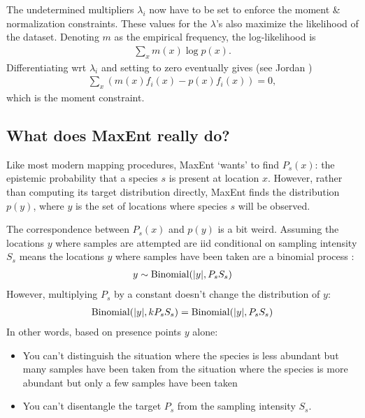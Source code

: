 \smallskip
The undetermined multipliers $\lambda_i$ now have to be set to enforce the moment \& normalization constraints. These values for the $\lambda$'s also maximize the likelihood of the dataset. Denoting $m$ as the empirical frequency, the log-likelihood is
\begin{eqnarray*}
    \sum_x m(x) \log p(x).
\end{eqnarray*}
Differentiating wrt $\lambda_i$ and setting to zero eventually gives (see Jordan \cite{Jordan:ch8}) 
\begin{eqnarray*}
    \sum_x \left(m(x) f_i(x) - p(x)f_i(x)\right) = 0,
\end{eqnarray*}
which is the moment constraint.

\subsection{What does MaxEnt really do?} 

Like most modern mapping procedures, MaxEnt `wants' to find $P_s(x)$: the epistemic probability that a species $s$ is present at location $x$. However, rather than computing its target distribution directly, MaxEnt finds the distribution $p(y)$, where $y$ is the set of locations where species $s$ will be observed. 

The correspondence between $P_s(x)$ and $p(y)$ is a bit weird. Assuming the locations $y$ where samples are attempted are iid conditional on sampling intensity $S_s$ means the locations $y$ where samples have been taken are a binomial process \cite{Moller:ch3}:
\begin{eqnarray*}
    y\sim \textup{Binomial}(|y|, P_s S_s) 
\end{eqnarray*}
However, multiplying $P_s$ by a constant doesn't change the distribution of $y$:
\begin{eqnarray*}
    \textup{Binomial}(|y|, k P_s S_s)=\textup{Binomial}(|y|, P_s S_s) 
\end{eqnarray*}
In other words, based on presence points $y$ alone: 
\begin{itemize}
    \item You can't distinguish the situation where the species is less abundant but many samples have been taken from the situation where the species is more abundant but only a few samples have been taken
    \item You can't disentangle the target $P_s$ from the sampling intensity $S_s$.
\end{itemize}

